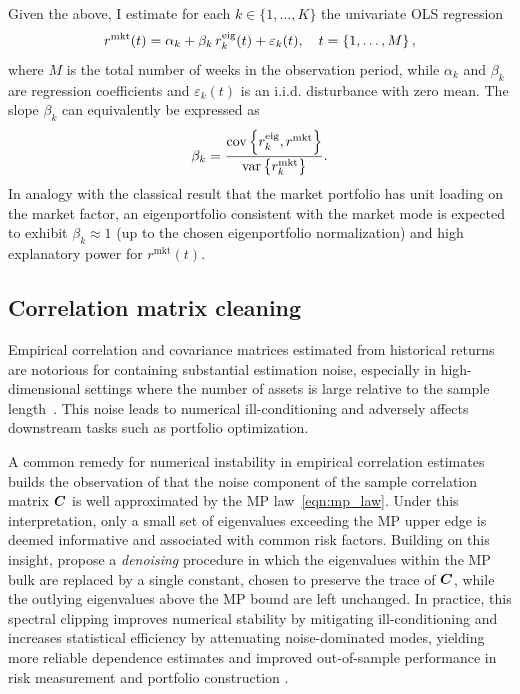 \documentclass[pdflatex,sn-basic]{sn-jnl}%
\theoremstyle{thmstyleone}%
\theoremstyle{thmstyletwo}%
\theoremstyle{thmstylethree}%
\begin{document}
Given the above, I estimate for each $k\in\{1,\ldots,K\}$ the univariate OLS regression
\begin{equation}
\label{eqn:method_market_factor_ols}
    r^{\textrm{mkt}}(t) = \alpha_k + \beta_k\, r^{\textrm{eig}}_k(t) + \varepsilon_k(t), \quad t = \left\{ 1,\ldots, M \right\},
\end{equation}
where $M$ is the total number of weeks in the observation period, while $\alpha_k$ and $\beta_k$ are regression coefficients and $\varepsilon_k(t)$ is an i.i.d. disturbance with zero mean. The slope $\beta_k$ can equivalently be expressed as
\begin{equation}
\label{eqn:beta}
    \beta_k = \frac{\mathrm{cov}\left\{ r^{\textrm{eig}}_k,r^{\textrm{mkt}} \right\}}{\mathrm{var}\left\{ r^{\textrm{mkt}}_k \right\}}.
\end{equation}
In analogy with the classical result that the market portfolio has unit loading on the market factor, an eigenportfolio consistent with the market mode is expected to exhibit $\beta_k\approx 1$ (up to the chosen eigenportfolio normalization) and high explanatory power for $r^{\textrm{mkt}}(t)$. 

\subsection{Correlation matrix cleaning}
Empirical correlation and covariance matrices estimated from historical returns are notorious for containing substantial estimation noise, especially in high-dimensional settings where the number of assets is large relative to
the sample length~\citep[see][Ch.2]{deprado2020machine}. This noise leads to numerical ill-conditioning and adversely affects downstream tasks such as portfolio optimization. 

A common remedy for numerical instability in empirical correlation estimates builds the observation of \citet{laloux1999noise} that the noise component of the sample correlation matrix $\boldsymbol{C}$ is well approximated by the MP law~\eqref{eqn:mp_law}. Under this interpretation, only a small set of eigenvalues exceeding the MP upper edge is deemed informative and associated with common risk factors. Building on this insight, \citet{laloux2000random} propose a \textit{denoising} procedure in which the eigenvalues within the MP bulk are replaced by a single constant, chosen to preserve the trace of $\boldsymbol{C}$, while the outlying eigenvalues above the MP bound are left unchanged. In practice, this spectral clipping improves numerical stability by mitigating ill-conditioning and increases statistical efficiency by attenuating noise-dominated modes, yielding more reliable dependence estimates and improved out-of-sample performance in risk measurement and portfolio construction \citep{pafka2003noisy}.
\end{document}
